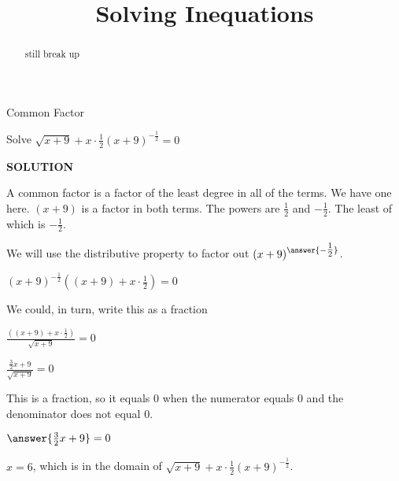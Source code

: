 \documentclass{ximera}
\title{Solving Inequations}
\begin{document}
\begin{abstract}
still break up
\end{abstract}
\maketitle





\begin{example}  Common Factor


Solve $\sqrt{x+9} + x \cdot \frac{1}{2} (x+9)^{-\tfrac{1}{2}} = 0$



\textbf{\textcolor{purple!50!blue!90!black}{SOLUTION}}



A common factor is a factor of the least degree in all of the terms.  We have one here. $(x+9)$ is a factor in both terms.  The powers are $\frac{1}{2}$ and $-\frac{1}{2}$. The least of which is $-\frac{1}{2}$.

We will use the distributive property to factor out $(x+9)^{\answer{-\tfrac{1}{2}}}$.


$(x+9)^{-\tfrac{1}{2}} \left((x+9) + x \cdot \frac{1}{2}\right)  = 0$


We could, in turn, write this as a fraction


$\frac{\left((x+9) + x \cdot \frac{1}{2}\right)}{\sqrt{x+9}} = 0$


$\frac{ \frac{3}{2} x + 9}{\sqrt{x+9}} = 0$



This is a fraction, so it equals $0$ when the numerator equals $0$ and the denominator does not equal $0$.


$\answer{\frac{3}{2} x + 9} = 0$



$x = 6$, which is in the domain of $\sqrt{x+9} + x \cdot \frac{1}{2} (x+9)^{-\tfrac{1}{2}}$.

\end{example}
\end{document}
